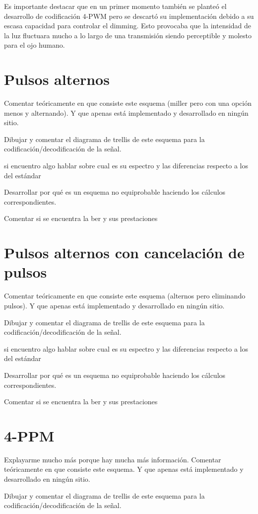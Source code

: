 Es importante destacar que en un primer momento también se planteó el desarrollo de codificación 4-PWM pero se descartó su 
implementación debido a su escasa capacidad para controlar el dimming. Esto provocaba que la intensidad de la luz 
fluctuara mucho a lo largo de una transmisión siendo perceptible y molesto para el ojo humano.

\section{Pulsos alternos}
Comentar teóricamente en que consiste este esquema (miller pero con una opción menos y alternando).
Y que apenas está implementado y desarrollado en ningún sitio.

Dibujar y comentar el diagrama de trellis de este esquema para la codificación/decodificación de la señal.

si encuentro algo hablar sobre cual es su espectro y las diferencias respecto a los del estándar

Desarrollar por qué es un esquema no equiprobable haciendo los cálculos correspondientes.

Comentar si se encuentra la ber y sus prestaciones

\section{Pulsos alternos con cancelación de pulsos}
Comentar teóricamente en que consiste este esquema (alternos pero eliminando pulsos).
Y que apenas está implementado y desarrollado en ningún sitio.

Dibujar y comentar el diagrama de trellis de este esquema para la codificación/decodificación de la señal.

si encuentro algo hablar sobre cual es su espectro y las diferencias respecto a los del estándar

Desarrollar por qué es un esquema no equiprobable haciendo los cálculos correspondientes.

Comentar si se encuentra la ber y sus prestaciones

\section{4-PPM}
Explayarme mucho más porque hay mucha más información.
Comentar teóricamente en que consiste este esquema.
Y que apenas está implementado y desarrollado en ningún sitio.

Dibujar y comentar el diagrama de trellis de este esquema para la codificación/decodificación de la señal.

